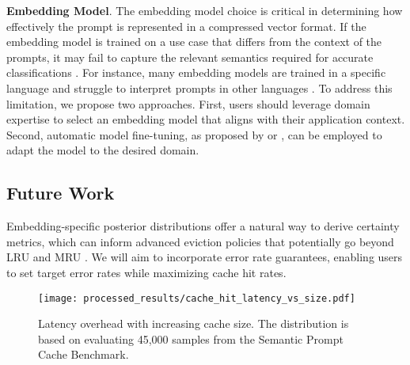 \textbf{Embedding Model}. The embedding model choice is critical in determining how effectively the prompt is represented in a compressed vector format. If the embedding model is trained on a use case that differs from the context of the prompts, it may fail to capture the relevant semantics required for accurate classifications \cite{tyshchuk2023isotropy}. For instance, many embedding models are trained in a specific language and struggle to interpret prompts in other languages \cite{chung2020rethinking}. To address this limitation, we propose two approaches. First, users should leverage domain expertise to select an embedding model that aligns with their application context. Second, automatic model fine-tuning, as proposed by \cite{zeighami2024nudge} or \cite{zhu2024efficient}, can be employed to adapt the model to the desired domain.

\subsection{Future Work}
\label{future-work}
Embedding-specific posterior distributions offer a natural way to derive certainty metrics, which can inform advanced eviction policies that potentially go beyond LRU and MRU \cite{mattson1970evaluation}. We will aim to incorporate error rate guarantees, enabling users to set target error rates while maximizing cache hit rates.

\begin{figure}[t]
  \centering
  \texttt{[image: processed\_results/cache\_hit\_latency\_vs\_size.pdf]}
  \caption{Latency overhead with increasing cache size. The distribution is based on evaluating 45,000 samples from the Semantic Prompt Cache Benchmark.}
  \label{fig:cache-size}
\end{figure}